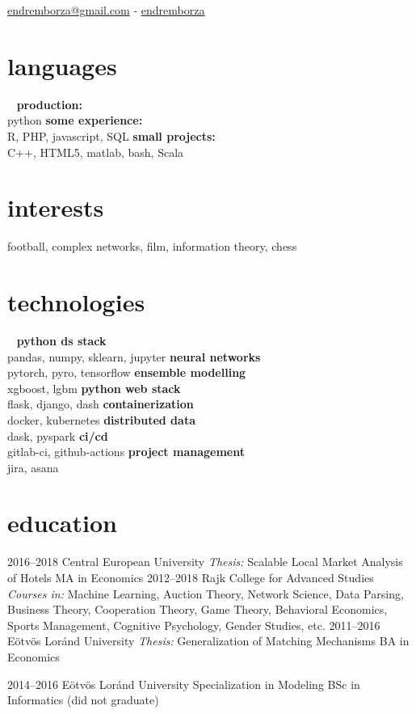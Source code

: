 \documentclass[]{friggeri-cv}
\begin{document}
       {\href{mailto:endremborza@gmail.com}{endremborza@gmail.com} - \href{https://github.com/endremborza/}{endremborza \faGithub}}


\begin{aside}
  \section{languages}
    ~
    \textbf{production:} \\ python
    \textbf{some experience:} \\ R, PHP, javascript, SQL
    \textbf{small projects:} \\ C++, HTML5, matlab, bash, Scala
  \section{interests}
    football, complex networks, film, 
    information theory, chess
  \section{technologies}
   ~
    \textbf{python ds stack} \\ pandas, numpy, sklearn, jupyter
    \textbf{neural networks} \\ pytorch, pyro, tensorflow
    \textbf{ensemble modelling} \\ xgboost, lgbm
    \textbf{python web stack} \\ flask, django, dash
    \textbf{containerization} \\ docker, kubernetes
    \textbf{distributed data} \\ dask, pyspark
    \textbf{ci/cd} \\ gitlab-ci, github-actions
    \textbf{project management} \\ jira, asana 
\end{aside}


\section{education}

\begin{entrylist}
  \entry
    {2016--2018}
    {Central European University}
    {\emph{Thesis: }Scalable Local Market Analysis of Hotels}
    {MA in Economics}
  \entry
    {2012--2018}
    {Rajk College for Advanced Studies}
    {}
    {\emph{Courses in:} Machine Learning, Auction Theory, Network Science, Data Parsing, Business Theory, Cooperation Theory, Game Theory, Behavioral Economics, Sports Management, Cognitive Psychology, Gender Studies,  etc.}
  \entry
    {2011--2016}
    {Eötvös Loránd University}
    {\emph{Thesis: }Generalization of Matching Mechanisms}
    {BA in Economics}
    
  \entry
    {2014--2016}
    {Eötvös Loránd University}
    {Specialization in Modeling}
    {BSc in Informatics (did not graduate)}

\end{entrylist}
\end{document}
